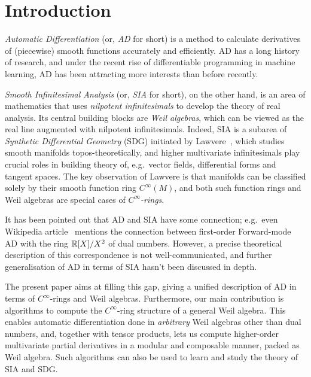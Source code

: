 \section{Introduction}\label{sec:intro}
\sloppy
\emph{Automatic Differentiation} (or, \emph{AD} for short) is a method to calculate derivatives of (piecewise) smooth functions accurately and efficiently.
AD has a long history of research, and under the recent rise of differentiable programming in machine learning, AD has been attracting more interests than before recently.

\emph{Smooth Infinitesimal Analysis} (or, \emph{SIA} for short), on the other hand, is an area of mathematics that uses \emph{nilpotent infinitesimals} to develop the theory of real analysis.
Its central building blocks are \emph{Weil algebras}, which can be viewed as the real line augmented with nilpotent infinitesimals.
Indeed, SIA is a subarea of \emph{Synthetic Differential Geometry} (SDG) initiated by Lawvere~\cite{lawvere1979categorical}, which studies smooth manifolds topos-theoretically, and higher multivariate infinitesimals play crucial roles in building theory of, e.g.\ vector fields, differential forms and tangent spaces.
The key observation of Lawvere is that manifolds can be classified solely by their smooth function ring $C^\infty(M)$, and both such function rings and Weil algebras are special cases of \emph{$C^\infty$-rings}.

It has been pointed out that AD and SIA have some connection; e.g.\ even Wikipedia article~\cite{Wikipedia:2021aa} mentions the connection between first-order Forward-mode AD with the ring $\mathbb{R}[X]/X^2$ of dual numbers.
However, a precise theoretical description of this correspondence is not well-communicated, and further generalisation of AD in terms of SIA hasn't been discussed in depth.

The present paper aims at filling this gap, giving a unified description of AD in terms of $C^\infty$-rings and Weil algebras.
Furthermore, our main contribution is algorithms to compute the $C^\infty$-ring structure of a general Weil algebra.
This enables automatic differentiation done in \emph{arbitrary} Weil algebras other than dual numbers, and, together with tensor products, lets us compute higher-order multivariate partial derivatives in a modular and composable manner, packed as Weil algebra.
Such algorithms can also be used to learn and study the theory of SIA and SDG.

